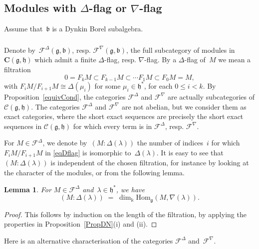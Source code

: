 \documentclass[11pt]{amsart}
\newcommand{\cF}{{\mathcal{F}}}
\newcommand{\bC}{\mathbf{C}}
\newcommand{\Hom}{\mathrm{Hom}}
\newcommand{\mk}{\Bbbk}
\newcommand{\cC}{\mathcal{C}}
\newcommand{\fg}{\mathfrak{g}}
\newcommand{\fh}{\mathfrak{h}}
\newcommand{\fb}{\mathfrak{b}}
\numberwithin{equation}{section}
\theoremstyle{plain}
\newtheorem{lemma}[subsubsection]{Lemma}
\theoremstyle{remark}
\theoremstyle{remark}
\theoremstyle{construction}
\begin{document}
\subsection{Modules with $\Delta$-flag or $\nabla$-flag} 
Assume that~$\fb$ is a Dynkin Borel subalgebra.
\subsubsection{}


Denote by~$\cF^{\Delta}(\fg,\fb)$, resp. $\cF^{\nabla}(\fg,\fb)$, the full subcategory of modules in~$\bC(\fg,\fh)$ which admit a finite ${\Delta}$-flag, resp. ${\nabla}$-flag. By a ${\Delta}$-flag of~$M$ we mean a filtration
\begin{equation}\label{eqDflag}0=F_kM\subset F_{k-1}M\subset\cdots F_1M\subset F_0M=M,\end{equation}
with $F_iM/F_{i+1}M\cong {\Delta}(\mu_i)$ for some $\mu_i\in\fh^\ast$, for each $0\le i<k$. By Proposition~\ref{equivCond}, the categories $\cF^\Delta$ and $\cF^\nabla$ are actually subcategories of $\cC(\fg,\fh)$. The categories $\cF^\Delta$ and $\cF^\nabla$  are not abelian, but we consider them as exact categories, where the short exact sequences are precisely the short exact sequences in $\cC(\fg,\fh)$ for which every term is in $\cF^\Delta$, resp. $\cF^\nabla$.


 
 
 
 For $M\in \cF^{\Delta}$, we denote  by~$(M:{\Delta}(\lambda))$ the number of indices~$i$ for which~$F_iM/F_{i+1}M$ in \eqref{eqDflag} is isomorphic to~${\Delta}(\lambda)$. It is easy to see that $(M:{\Delta}(\lambda))$ is independent of the chosen filtration, for instance by looking at the character of the modules, or from the following lemma.

\begin{lemma}\label{LemDN}
For $M\in \cF^{\Delta}$ and~$\lambda\in\fh^\ast$, we have
$$(M:{\Delta}(\lambda))\;=\;\dim_{\mk}\Hom_{\fg}(M,{\nabla}(\lambda)).$$
\end{lemma}
\begin{proof}
This follows by induction on the length of the filtration, by applying the properties in Proposition~\ref{PropDN}(i) and (ii).
\end{proof}
{Here is an} alternative characterisation of the categories $\cF^{\Delta}$ and~$\cF^{\nabla}$.
\end{document}
